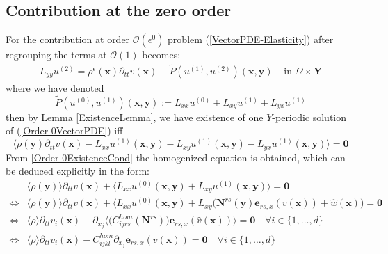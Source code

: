 \subsection{Contribution at the zero order}
For the contribution at order $\mathcal{O}(\epsilon^0)$ problem (\ref{VectorPDE-Elasticity}) after regrouping the terms at $\mathcal{O}(1)$ becomes:
\begin{equation}
    \label{Order-0VectorPDE}
    \begin{array}{cc}
        L_{yy} u^{(2)} = \rho^{\epsilon}(\mathbf{x})\partial_{tt} v(\mathbf{x}) - \tilde{P}(u^{(1)},u^{(2)}) (\mathbf{x},\mathbf{y}) & \text{ in } \Omega \times \mathbf{Y}
    \end{array}
\end{equation}
where we have denoted 
\begin{equation*}
    \tilde{P}(u^{(0)}, u^{(1)}) (\mathbf{x},\mathbf{y}) :=  L_{xx} u^{(0)} + L_{xy} u^{(1)} + L_{yx} u^{(1)}
\end{equation*}
then by Lemma \ref{ExistenceLemma}, we have existence of one $Y$-periodic solution of (\ref{Order-0VectorPDE}) iff 
\begin{equation}
    \label{Order-0ExistenceCond}
    \big \langle \rho(\mathbf{y}) \partial_{tt} v(\mathbf{x}) - L_{xx} u^{(1)} (\mathbf{x},\mathbf{y}) - L_{xy} u^{(1)}(\mathbf{x},\mathbf{y}) - L_{yx} u^{(1)}(\mathbf{x},\mathbf{y}) \big \rangle = \mathbf{0}
\end{equation}
From \ref{Order-0ExistenceCond} the homogenized equation is obtained, which can be deduced explicitly in the form:
\begin{align*}
    &\langle \rho(\mathbf{y}) \rangle \partial_{tt} v(\mathbf{x}) + \langle L_{xx} u^{(0)}(\mathbf{x},\mathbf{y}) +L_{xy} u^{(1)}(\mathbf{x},\mathbf{y}) \rangle = \mathbf{0} \\
    \Leftrightarrow & \langle \rho(\mathbf{y}) \rangle \partial_{tt} v(\mathbf{x}) + \langle L_{xx} u^{(0)}(\mathbf{x}, \mathbf{y}) + L_{xy}\big( \mathbf{N}^{rs}(\mathbf{y})\mathbf{e}_{rs,x}(v(\mathbf{x})) + \hat{w}(\mathbf{x})\big) = \mathbf{0} \\
    \Leftrightarrow & \langle \rho\rangle \partial_{tt} v_i(\mathbf{x}) - \partial_{x_j}\big \langle \big(C_{ijrs}^{hom}(\mathbf{N}^{rs})\big) \mathbf{e}_{rs,x}(\hat{v}(\mathbf{x})) \big \rangle  = \mathbf{0} \quad \forall i \in \{1,\dots, d\}\\
    \Leftrightarrow& \langle \rho \rangle \partial_{tt} v_i(\mathbf{x}) - C_{ijkl}^{hom} \partial_{x_j} \mathbf{e}_{rs,x} (v(\mathbf{x})) = \mathbf{0} \quad \forall i \in \{1,\dots,d\}
\end{align*}

